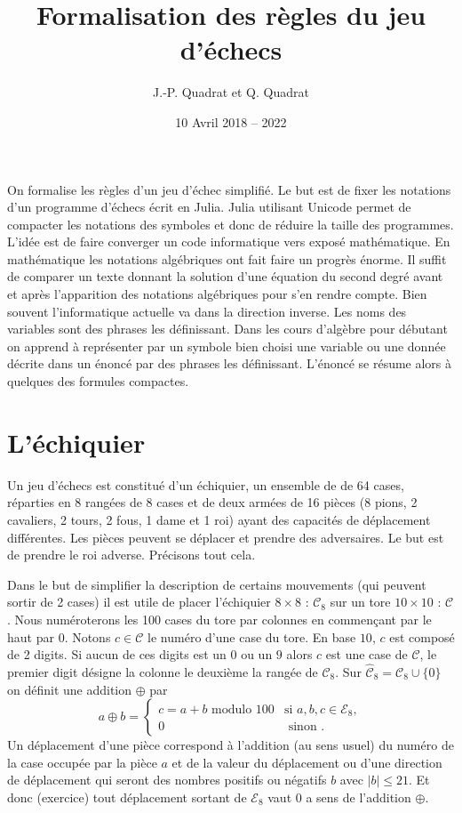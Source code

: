 \documentclass[11pt]{article}
\newcommand{\EE}{{\mathcal{E}}}
\newcommand{\CC}{{\mathcal{C}}}
\begin{document}
\title{Formalisation des règles du jeu d'échecs}
\author{J.-P. Quadrat et Q. Quadrat}
\date{10 Avril 2018 -- 2022}
\maketitle

On formalise les règles d'un jeu d'échec simplifié. Le but est de fixer les notations d'un programme
d'échecs écrit en Julia. Julia utilisant Unicode permet de  compacter les notations des symboles
et donc de réduire la taille des programmes. L'idée est de faire converger un code informatique
vers exposé mathématique. En mathématique les notations algébriques ont fait faire un progrès énorme.
Il suffit de comparer un texte donnant la solution d'une équation du second degré avant et après l'apparition
des notations algébriques pour s'en rendre compte. Bien souvent l'informatique actuelle va dans la direction
inverse. Les noms des variables sont des phrases les définissant. Dans les cours d'algèbre pour débutant
on apprend à représenter par un symbole bien choisi une variable ou une donnée décrite dans un énoncé
par des phrases les définissant. L'énoncé se résume alors à quelques des formules compactes.

\section{L'échiquier}

\newgame
\begin{center}\showboard\end{center}

Un jeu d'échecs est constitué d'un échiquier, un ensemble de de 64 cases, réparties en  8 rangées de 8 cases et de deux armées
de 16 pièces (8 pions, 2 cavaliers, 2 tours, 2 fous, 1 dame et 1 roi) ayant des capacités de déplacement différentes. Les
pièces peuvent se déplacer et prendre des adversaires. Le but est de prendre le roi adverse.  Précisons tout cela.

Dans le but de simplifier la description de certains mouvements (qui peuvent sortir de 2 cases)  il est utile de placer l'échiquier
$8 \times 8$ : $\CC_8$ sur un tore  $10 \times 10 $ : $\CC$. Nous numéroterons les 100 cases du tore par colonnes en commençant par le haut
par $0$. Notons $c\in \CC$ le numéro d'une case du tore. En base $10$, $c$ est composé de 2 digits. Si aucun de ces digits est un $0$ ou un $9$ alors $c$ est une case de $\CC$, le premier digit  désigne la colonne le deuxième la rangée de $\CC_8$. Sur $\hat{\CC}_8=\CC_8\cup \{0\}$ on définit une addition $\oplus$ par
$$a\oplus b=\left\{
\begin{array}{cl}
 c=a+b \mbox{ modulo } 100 & \mbox{si } a,b,c\in\EE_8 ,\\
                       0   &  \mbox{ sinon .}
 \end{array}  \right .  $$
Un déplacement d'une pièce correspond à l'addition (au sens usuel) du numéro de la case occupée par la pièce $a$ et de la valeur du déplacement ou d'une direction de déplacement qui seront des nombres positifs ou négatifs $b$ avec $ | b |\leq 21$. Et donc (exercice) tout déplacement sortant de $\EE_8$ vaut $0$ a sens de l'addition $\oplus$.
\end{document}
